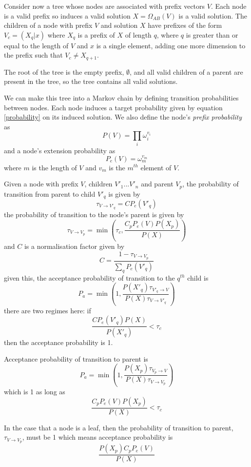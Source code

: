\documentclass{article}
\begin{document}
Consider now a tree whose nodes are associated with prefix vectors $V$. Each node is a valid prefix so induces a valid solution $X = \Omega_{AB}(V)$ is a valid solution. The children of a node with prefix $V$ and solution $X$ have prefixes of the form $V_c = (X_q|x)$ where $X_q$ is a prefix of $X$ of length $q$, where $q$ is greater than or equal to the length of $V$ and $x$ is a single element, adding one more dimension to the prefix such that $V_c \ne X_{q+1}$.

The root of the tree is the empty prefix, $\emptyset$, and all valid children of a parent are present in the tree, so the tree contains all valid solutions.

We can make this tree into a Markov chain by defining transition probabilities between nodes. Each node induces a target probability given by equation \ref{probability} on its induced solution. We also define the node's \textit{prefix probability} as 
\[
P(V) = \prod_i \omega_i^{v_i}
\]
and a node's extension probability as
\[
P_e(V) = \omega_m^{v_m}
\]
where $m$ is the length of $V$ and $v_m$ is the $m^{th}$ element of $V$.

Given a node with prefix $V$, children $V'_1...V'_n$ and parent $V_p$, the probability of transition from parent to child $V'_q$ is given by
\[
\tau_{V\rightarrow V'_q} = CP_e(V'_q)
\]
the probability of transition to the node's parent is given by
\[
\tau_{V\rightarrow V_p} = \min\left(\tau_c, \frac{C_pP_e(V)P(X_p)}{P(X)}\right)
\]
and $C$ is a normalisation factor given by
\[
C =  \frac{1 - \tau_{V\rightarrow V_p}}{\sum_q P_e(V'_q)}
\]
given this, the acceptance probability of transition to the $q^{th}$ child is
\[
P_a = \min\left(1, \frac{P(X'_q)\tau_{V'_q\rightarrow V}}{P(X)\tau_{V\rightarrow V'_q}}\right)
\]
there are two regimes here: if
\[
\frac{CP_e(V'_q)P(X)}{P(X'_q)} < \tau_c 
\]
then the acceptance probability is 1.

Acceptance probability of transition to parent is
\[
P_a = \min\left(1, \frac{P(X_p)\tau_{V_p\rightarrow V}}{P(X)\tau_{V\rightarrow V_p}}\right)
\]
which is 1 as long as
\[
\frac{C_pP_e(V)P(X_p)}{P(X)} < \tau_c
\]

In the case that a node is a leaf, then the probability of transition to parent, $\tau_{V\rightarrow V_p}$, must be 1 which means acceptance probability is
\[
\frac{P(X_p)C_pP_e(V)}{P(X)}
\]


%
% 


\end{document}
